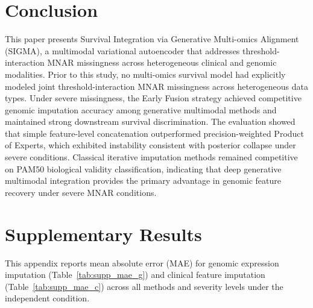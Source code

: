 \documentclass[final,3p,times,authoryear]{elsarticle}
\begin{document}
\section{Conclusion}
\label{sec:conclusion}
This paper presents Survival Integration via Generative Multi-omics Alignment (SIGMA), a multimodal variational autoencoder that addresses threshold-interaction MNAR missingness across heterogeneous clinical and genomic modalities. Prior to this study, no multi-omics survival model had explicitly modeled joint threshold-interaction MNAR missingness across heterogeneous data types. Under severe missingness, the Early Fusion strategy achieved competitive genomic imputation accuracy among generative multimodal methods and maintained strong downstream survival discrimination. The evaluation showed that simple feature-level concatenation outperformed precision-weighted Product of Experts, which exhibited instability consistent with posterior collapse under severe conditions. Classical iterative imputation methods remained competitive on PAM50 biological validity classification, indicating that deep generative multimodal integration provides the primary advantage in genomic feature recovery under severe MNAR conditions.

%
%
%

\renewcommand{\bibfont}{\small}
\appendix
\renewcommand{\thetable}{A.\arabic{table}}
\renewcommand{\theHtable}{appendix.\arabic{table}}
\setcounter{table}{0}
\section{Supplementary Results}
\label{app:mae}

This appendix reports mean absolute error (MAE) for genomic expression imputation (Table~\ref{tab:supp_mae_g}) and clinical feature imputation (Table~\ref{tab:supp_mae_c}) across all methods and severity levels under the independent condition.
\end{document}
